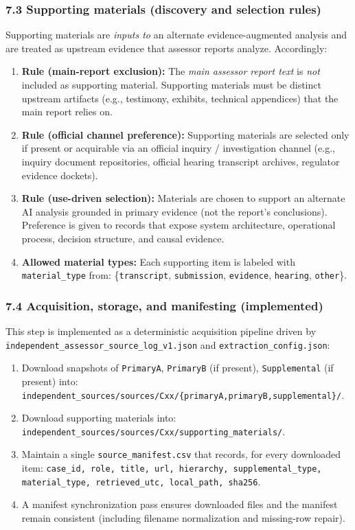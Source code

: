 {\subsubsection*{7.3 Supporting materials (discovery and selection rules)}
Supporting materials are \emph{inputs to} an alternate evidence-augmented analysis and are treated as upstream evidence that assessor reports analyze.
Accordingly:
\begin{enumerate}
  \item \textbf{Rule (main-report exclusion):} The \emph{main assessor report text} is \emph{not} included as supporting material.
        Supporting materials must be distinct upstream artifacts (e.g., testimony, exhibits, technical appendices) that the main report relies on.
  \item \textbf{Rule (official channel preference):} Supporting materials are selected only if present or acquirable via an official inquiry / investigation channel
        (e.g., inquiry document repositories, official hearing transcript archives, regulator evidence dockets).
  \item \textbf{Rule (use-driven selection):} Materials are chosen to support an alternate AI analysis grounded in primary evidence (not the report’s conclusions).
        Preference is given to records that expose system architecture, operational process, decision structure, and causal evidence.
  \item \textbf{Allowed material types:} Each supporting item is labeled with \texttt{material\_type} from:
        \{\texttt{transcript}, \texttt{submission}, \texttt{evidence}, \texttt{hearing}, \texttt{other}\}.
\end{enumerate}

\subsubsection*{7.4 Acquisition, storage, and manifesting (implemented)}
This step is implemented as a deterministic acquisition pipeline driven by \\ \texttt{independent\_assessor\_source\_log\_v1.json}
and \texttt{extraction\_config.json}:
\begin{enumerate}
  \item Download snapshots of \texttt{PrimaryA}, \texttt{PrimaryB} (if present), \texttt{Supplemental} (if present) into:
        \texttt{independent\_sources/sources/Cxx/\{primaryA,primaryB,supplemental\}/}.
  \item Download supporting materials into:
        \texttt{independent\_sources/sources/Cxx/supporting\_materials/}.
  \item Maintain a single \texttt{source\_manifest.csv} that records, for every downloaded item:
        \texttt{case\_id, role, title, url, hierarchy, supplemental\_type, material\_type, retrieved\_utc, local\_path, sha256}.
  \item A manifest synchronization pass ensures downloaded files and the manifest remain consistent (including filename normalization and missing-row repair).
\end{enumerate}

}
